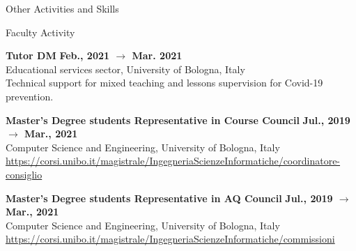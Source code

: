 \documentclass{resume} %
\begin{document}
    \begin{rSection}{Other Activities and Skills}


        \begin{rSubsection2}{Faculty Activity}
            \item\textbf{ Tutor DM }\hfill \textbf{Feb., 2021 $\rightarrow$ Mar. 2021}
            \\Educational services sector, University of Bologna, Italy
            \\Technical support for mixed teaching and lessons supervision for Covid-19 prevention.
            \item\textbf{ Master's Degree students Representative in Course Council }\hfill \textbf{Jul., 2019 $\rightarrow$ Mar., 2021}
            \\Computer Science and Engineering, University of Bologna, Italy
            \\\url{https://corsi.unibo.it/magistrale/IngegneriaScienzeInformatiche/coordinatore-consiglio}
            \item\textbf{ Master's Degree students Representative in AQ Council }\hfill \textbf{Jul., 2019 $\rightarrow$ Mar., 2021}
            \\Computer Science and Engineering, University of Bologna, Italy
            \\\url{https://corsi.unibo.it/magistrale/IngegneriaScienzeInformatiche/commissioni}
        \end{rSubsection2}



\end{rSection}
\end{document}

